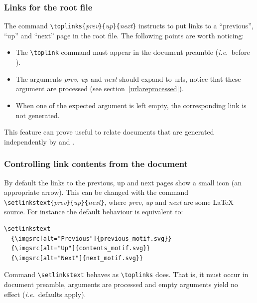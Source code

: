 \subsubsection{Links for the root file}
The command \verb+\toplinks{+\textit{prev}\verb+}{+\textit{up}\verb+}{+\textit{next}\verb+}+ instructs \hacha{}  to put links to a
``previous'', ``up'' and ``next'' page in the root file.
The following points are worth noticing:
\begin{itemize}
\item The \verb+\toplink+ command must appear in the document preamble
(\emph{i.e.}\ before \verb++).
\item The arguments
\textit{prev}, \textit{up} and \textit{next} should expand to urls,
notice that these argument are processed (see section~\ref{urlareprocessed}).
\item When one of the expected argument is left empty,
the corresponding link is not generated.
\end{itemize}
This feature can prove useful to
relate documents that are generated independently by
\hevea{} and \hacha{}.

\subsubsection{Controlling link contents from the document}
%
By default the links to the previous, up and next pages show a small
icon (an appropriate arrow). This can be changed with the command
\verb+\setlinkstext{+\textit{prev}\verb+}{+\textit{up}\verb+}{+\textit{next}\verb+}+,
where \textit{prev}, \textit{up} and \textit{next} are some \LaTeX{}
source.
For instance the default behaviour is equivalent to:
\begin{verbatim}
\setlinkstext
  {\imgsrc[alt="Previous"]{previous_motif.svg}}
  {\imgsrc[alt="Up"]{contents_motif.svg}}
  {\imgsrc[alt="Next"]{next_motif.svg}}
\end{verbatim}
Command \verb+\setlinkstext+ behaves as \verb+\toplinks+ does.
That is, it must occur in document preamble, arguments are processed
and empty arguments yield no effect (\emph{i.e.}\ defaults apply).

